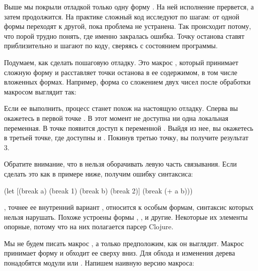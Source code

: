 
Выше мы покрыли отладкой только одну форму . На ней исполнение прервется, а затем продолжится. На практике сложный код исследуют по шагам: от одной формы переходят к другой, пока проблема не устранена. Так происходит потому, что порой трудно понять, где именно закралась ошибка. Точку останова ставят приблизительно и шагают по коду, сверяясь с состоянием программы.

Подумаем, как сделать пошаговую отладку. Это макрос , который принимает сложную форму и расставляет точки останова в ее содержимом, в том числе вложенных формах. Например, форма  со сложением двух чисел после обработки макросом выглядит так:

\begin{english}
\end{english}

Если ее выполнить, процесс станет похож на настоящую отладку. Сперва вы окажетесь в первой точке . В этот момент не доступна ни одна локальная переменная. В точке  появится доступ к переменной . Выйдя из нее, вы окажетесь в третьей точке, где доступны  и . Покинув третью точку, вы получите результат 3.

Обратите внимание, что в  нельзя оборачивать левую часть связывания. Если сделать это как в примере ниже, получим ошибку синтаксиса:

\begin{english}
  \begin{clojure}
(let [(break a) (break 1)
      (break b) (break 2)]
  (break (+ a b)))
  \end{clojure}
\end{english}

, точнее ее внутренний вариант , относится к особым формам, синтаксис которых нельзя нарушать. Похоже устроены формы , ,  и другие. Некоторые их элементы опорные, потому что на них полагается парсер Clojure.

Мы не будем писать макрос , а только предположим, как он выглядит. Макрос принимает форму и обходит ее сверху вниз. Для обхода и изменения дерева понадобятся модули  или . Напишем наивную версию макроса:

